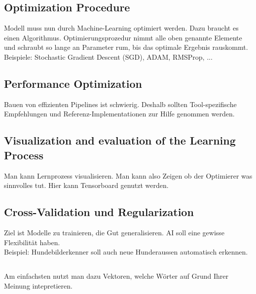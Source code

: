 \subsection{Optimization Procedure}
Modell muss nun durch Machine-Learning optimiert werden. Dazu braucht es einen Algorithmus. Optimierungsprozedur nimmt alle oben genannte Elemente und schraubt so lange an Parameter rum, bis das optimale Ergebnis rauskommt.
\\
Beispiele: Stochastic Gradient Descent (SGD), ADAM, RMSProp, ...
\subsection{Performance Optimization}
Bauen von effizienten Pipelines ist schwierig. Deshalb sollten Tool-spezifische Empfehlungen und Referenz-Implementationen zur Hilfe genommen werden.
\subsection{Visualization and evaluation of the Learning Process}
Man kann Lernprozess visualisieren. Man kann also Zeigen ob der Optimierer was sinnvolles tut. Hier kann Tensorboard genutzt werden.
\subsection{Cross-Validation und Regularization}
Ziel ist Modelle zu trainieren, die Gut generalisieren. AI soll eine gewisse Flexibilität haben. \\
Beispiel: Hundebilderkenner soll auch neue Hunderaussen automatisch erkennen.
\subsection{}
Am einfachsten nutzt man dazu Vektoren, welche Wörter auf Grund Ihrer Meinung intepretieren.
